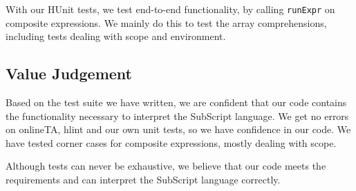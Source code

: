 \documentclass{article}
\begin{document}
With our HUnit tests, we test end-to-end functionality, by calling \texttt{runExpr} on composite expressions. We mainly do this to test the array comprehensions, including tests dealing with scope and environment.

\subsection{Value Judgement}
Based on the test suite we have written, we are confident that our code contains the functionality necessary to interpret the SubScript language. We get no errors on onlineTA, hlint and our own unit tests, so we have confidence in our code.  We have tested corner cases for composite expressions, mostly dealing with scope.

Although tests can never be exhaustive, we believe that our code meets the requirements and can interpret the SubScript language correctly.
\end{document}

